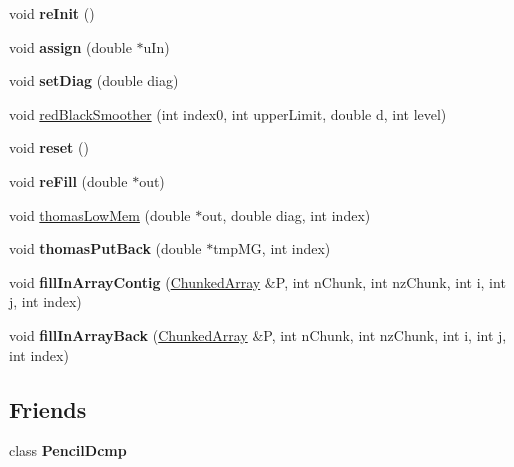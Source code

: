\begin{DoxyCompactItemize}
\item 
\mbox{\label{classMultiGrid_aa8bf25e31b2ffca02740fe3d2b3f89e3}} 
void {\bfseries re\+Init} ()
\item 
\mbox{\label{classMultiGrid_a9715421cd6c87064b998b2d93dcd37e9}} 
void {\bfseries assign} (double $\ast$u\+In)
\item 
\mbox{\label{classMultiGrid_a638a568e8193db34c3903d0546b334af}} 
void {\bfseries set\+Diag} (double diag)
\item 
void \mbox{\hyperlink{classMultiGrid_ac392828b24eca28c66ba6a0937f1ef25}{red\+Black\+Smoother}} (int index0, int upper\+Limit, double d, int level)
\item 
\mbox{\label{classMultiGrid_a7f499684b58c9431c9d0e1bc6287e302}} 
void {\bfseries reset} ()
\item 
\mbox{\label{classMultiGrid_ae82947988c34258ddad5e15f6553a0a1}} 
void {\bfseries re\+Fill} (double $\ast$out)
\item 
void \mbox{\hyperlink{classMultiGrid_ab84905fee399df9379238a11bd7cd308}{thomas\+Low\+Mem}} (double $\ast$out, double diag, int index)
\item 
\mbox{\label{classMultiGrid_a5f461e7fa65160cd891ac8153bc83bc4}} 
void {\bfseries thomas\+Put\+Back} (double $\ast$tmp\+MG, int index)
\item 
\mbox{\label{classMultiGrid_aab4206811c64845b3332e17ab2be689e}} 
void {\bfseries fill\+In\+Array\+Contig} (\mbox{\hyperlink{classChunkedArray}{Chunked\+Array}} \&P, int n\+Chunk, int nz\+Chunk, int i, int j, int index)
\item 
\mbox{\label{classMultiGrid_af2470fdb5afbc19b40ea4eb09064200e}} 
void {\bfseries fill\+In\+Array\+Back} (\mbox{\hyperlink{classChunkedArray}{Chunked\+Array}} \&P, int n\+Chunk, int nz\+Chunk, int i, int j, int index)
\end{DoxyCompactItemize}
\subsection*{Friends}
\begin{DoxyCompactItemize}
\item 
\mbox{\label{classMultiGrid_a89c0195380e113e4d774b5977badc321}} 
class {\bfseries Pencil\+Dcmp}
\end{DoxyCompactItemize}


